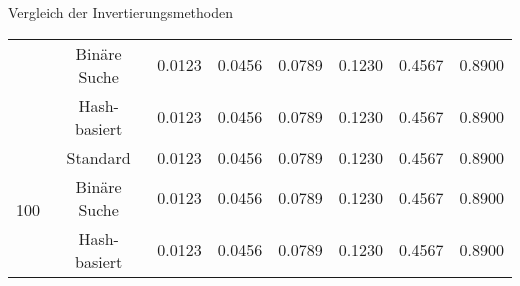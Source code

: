 \begin{frame}{Vergleich der Invertierungsmethoden}
\begin{table}
\begin{tabular}{c|c|c|c|c|c|c|c}
             & Binäre Suche & 0.0123 & 0.0456 & 0.0789 & 0.1230 & 0.4567 & 0.8900 \\
             & Hash-basiert & 0.0123 & 0.0456 & 0.0789 & 0.1230 & 0.4567 & 0.8900 \\
            \hline
            \multirow{3}{*}{100} & Standard & 0.0123 & 0.0456 & 0.0789 & 0.1230 & 0.4567 & 0.8900 \\
             & Binäre Suche & 0.0123 & 0.0456 & 0.0789 & 0.1230 & 0.4567 & 0.8900 \\
             & Hash-basiert & 0.0123 & 0.0456 & 0.0789 & 0.1230 & 0.4567 & 0.8900
        \end{tabular}
    \end{table}
    

\end{frame}

